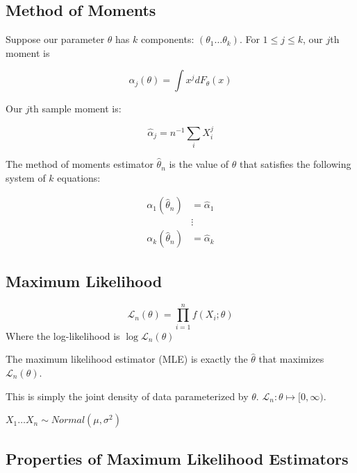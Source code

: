 \documentclass[10pt]{article}
\begin{document}
\subsection{Method of Moments}

Suppose our parameter $\theta$ has $k$ components: $(\theta_1 \dots \theta_k)$.
For $1 \leq j \leq k$, our $j$th moment is 

\[\alpha_j(\theta) = \int x^j dF_{\theta}(x)\]

Our $j$th sample moment is:

\[\hat{\alpha}_j = n^{-1} \sum_i X_i^j \]

\begin{definition}
    The method of moments estimator $\hat{\theta}_n$ is the value of $\theta$
    that satisfies the following system of $k$ equations:

    \begin{align*}
        \alpha_1(\hat{\theta}_n) &= \hat{\alpha}_1 \\
        &\vdots \\
        \alpha_k(\hat{\theta}_n) &= \hat{\alpha}_k
    \end{align*}

\end{definition}

\subsection{Maximum Likelihood}

\begin{definition}
    \[ \mathcal{L}_n(\theta) = \prod_{i=1}^n f(X_i; \theta) \]
    Where the log-likelihood is $\log \mathcal{L}_n(\theta)$
\end{definition}

\begin{definition}
    The maximum likelihood estimator (MLE) is exactly the $\hat{\theta}$ that
    maximizes $\mathcal{L}_n(\theta)$.
\end{definition}

This is simply the joint density of data parameterized by $\theta$.
$\mathcal{L}_n : \theta \mapsto [0, \infty)$.

\begin{example}
    $X_1 \dots X_n \sim Normal(\mu, \sigma^2)$
\end{example}

\subsection{Properties of Maximum Likelihood Estimators}
\end{document}
